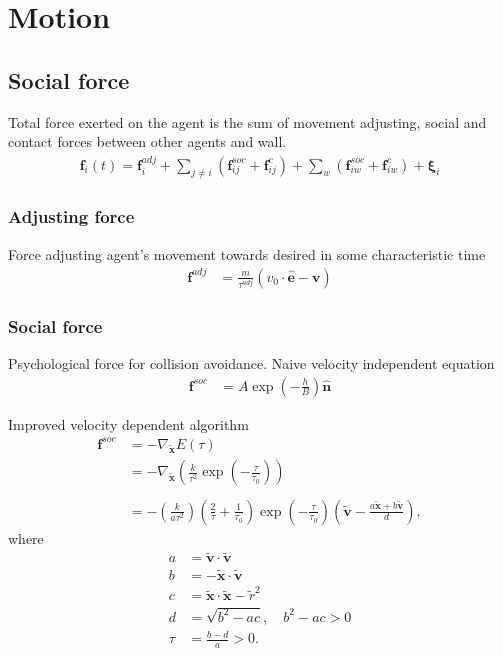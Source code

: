 \section{Motion}
\subsection{Social force}
Total force exerted on the agent is the sum of movement adjusting, social and contact forces between other agents and wall.
\begin{align}
\mathbf{f}_{i}(t) = \mathbf{f}_{i}^{adj} + \sum_{j\neq i}^{} \left(\mathbf{f}_{ij}^{soc} + \mathbf{f}_{ij}^{c}\right) + \sum_{w}^{} \left(\mathbf{f}_{iw}^{soc} + \mathbf{f}_{iw}^{c}\right) + \boldsymbol{\xi}_{i}
\end{align}


\subsubsection{Adjusting force}
Force adjusting agent's movement towards desired in some characteristic time \begin{align}
\mathbf{f}^{adj} &= \frac{m}{\tau^{adj}} (v_{0} \cdot \hat{\mathbf{e}} - \mathbf{v}) 
\end{align}


\subsubsection{Social force}
Psychological force for collision avoidance. Naive velocity independent equation
\begin{align}
\mathbf{f}^{soc} &= A \exp\left(-\frac{h}{B}\right) \hat{\mathbf{n}}
\end{align}

Improved velocity dependent algorithm
\begin{align}
\mathbf{f}^{soc} &= -\nabla_{\tilde{\mathbf{x}}} E(\tau)  \\
&= -\nabla_{\tilde{\mathbf{x}}} \left(\frac{k}{\tau^{2}} \exp \left( -\frac{\tau}{\tau_{0}} \right) \right) \\
\\
&= - \left(\frac{k}{a \tau^{2}}\right) 
\left(\frac{2}{\tau} + \frac{1}{\tau_{0}}\right) 
\exp\left (-\frac{\tau}{\tau_{0}}\right )
\left(\tilde{\mathbf{v}} -\frac{a \tilde{\mathbf{x}} + b \tilde{\mathbf{v}}}{d} \right),
\end{align}
where
\begin{align}
a &= \tilde{\mathbf{v}} \cdot \tilde{\mathbf{v}} \\
b &= -\tilde{\mathbf{x}} \cdot \tilde{\mathbf{v}} \\
c &= \tilde{\mathbf{x}} \cdot \tilde{\mathbf{x}} - \tilde{r}^{2} \\
d &= \sqrt{b^{2} - a c}, \quad b^{2} - a c > 0 \\
\tau &= \frac{b - d}{a} > 0.
\end{align}


